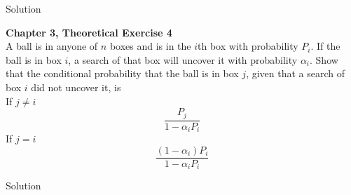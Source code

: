 \documentclass{article}
\begin{document}
\begin{spacing}{1.1}
\begin{homeworkProblem}
\begin{homeworkSection}{Solution}
  \end{homeworkSection}
\end{homeworkProblem}
\newpage
\begin{homeworkProblem}
  {\bf Chapter 3, Theoretical Exercise 4}\\
  A ball is in anyone of $n$ boxes and is in the $i$th box with 
  probability $P_i$. If the ball is in box $i$, a search of that 
  box will uncover it with probability $\alpha_i$. Show that the 
  conditional probability that the ball is in box $j$, given that 
  a search of box $i$ did not uncover it, is \\
  If $j \neq i$
    \[\frac{ P_j}{ 1 - \alpha_i P_i}\]
  If $j = i$
    \[\frac{ (1 - \alpha_i) P_i}{ 1 - \alpha_i P_i}\]
  \begin{homeworkSection}{Solution}
    
  \end{homeworkSection}
\end{homeworkProblem}
\end{spacing}
\end{document}
